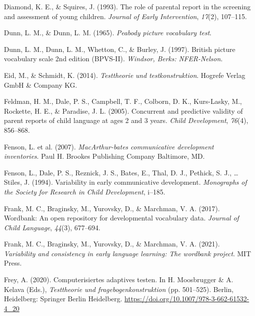 \documentclass[
  man,floatsintext]{apa6}
\newlength{\cslhangindent}
\newlength{\cslentryspacingunit} %
\newenvironment{CSLReferences}[2] %
 {%
  \setlength{\parindent}{0pt}
  \ifodd #1
  \let\oldpar\par
  \def\par{\hangindent=\cslhangindent\oldpar}
  \fi
  \setlength{\parskip}{#2\cslentryspacingunit}
 }%
 {}
\begin{document}
\begin{CSLReferences}{1}{0}
\leavevmode{}%
Diamond, K. E., \& Squires, J. (1993). The role of parental report in the screening and assessment of young children. \emph{Journal of Early Intervention}, \emph{17}(2), 107--115.

\leavevmode{}%
Dunn, L. M., \& Dunn, L. M. (1965). \emph{Peabody picture vocabulary test}.

\leavevmode{}%
Dunn, L. M., Dunn, L. M., Whetton, C., \& Burley, J. (1997). British picture vocabulary scale 2nd edition (BPVS-II). \emph{Windsor, Berks: NFER-Nelson}.

\leavevmode{}%
Eid, M., \& Schmidt, K. (2014). \emph{Testtheorie und testkonstruktion}. Hogrefe Verlag GmbH \& Company KG.

\leavevmode{}%
Feldman, H. M., Dale, P. S., Campbell, T. F., Colborn, D. K., Kurs-Lasky, M., Rockette, H. E., \& Paradise, J. L. (2005). Concurrent and predictive validity of parent reports of child language at ages 2 and 3 years. \emph{Child Development}, \emph{76}(4), 856--868.

\leavevmode{}%
Fenson, L. et al. (2007). \emph{MacArthur-bates communicative development inventories}. Paul H. Brookes Publishing Company Baltimore, MD.

\leavevmode{}%
Fenson, L., Dale, P. S., Reznick, J. S., Bates, E., Thal, D. J., Pethick, S. J., \ldots{} Stiles, J. (1994). Variability in early communicative development. \emph{Monographs of the Society for Research in Child Development}, i--185.

\leavevmode{}%
Frank, M. C., Braginsky, M., Yurovsky, D., \& Marchman, V. A. (2017). Wordbank: An open repository for developmental vocabulary data. \emph{Journal of Child Language}, \emph{44}(3), 677--694.

\leavevmode{}%
Frank, M. C., Braginsky, M., Yurovsky, D., \& Marchman, V. A. (2021). \emph{Variability and consistency in early language learning: The wordbank project}. MIT Press.

\leavevmode{}%
Frey, A. (2020). Computerisiertes adaptives testen. In H. Moosbrugger \& A. Kelava (Eds.), \emph{Testtheorie und fragebogenkonstruktion} (pp. 501--525). Berlin, Heidelberg: Springer Berlin Heidelberg. \url{https://doi.org/10.1007/978-3-662-61532-4_20}


\end{CSLReferences}
\end{document}
